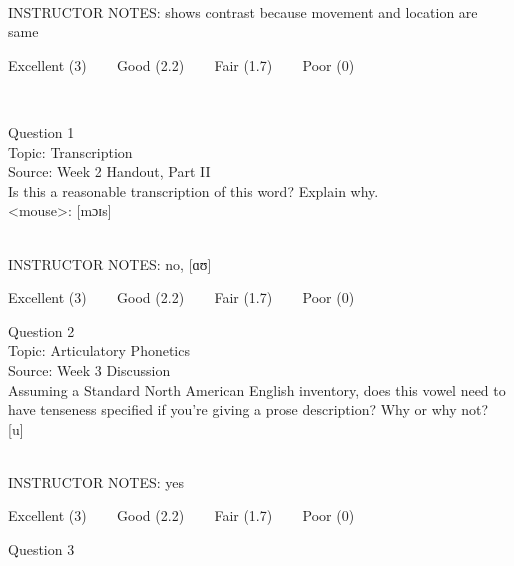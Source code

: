 \documentclass[12pt]{article}
\begin{document}
~\\
INSTRUCTOR NOTES: shows contrast because movement and location are same


\vfill
Excellent (3) ~~~ Good (2.2) ~~~ Fair (1.7) ~~~ Poor (0)
\newpage

\begin{center}
\textbf{{\color{red}{\HUGE END OF EXAM}}}\\

\end{center}
\newpage

\begin{center}
\textbf{{\color{blue}{\HUGE START OF EXAM\\}}}

\textbf{{\color{blue}{\HUGE Student ID: 68382\\}}}

\textbf{{\color{blue}{\HUGE \\}}}

\end{center}
\newpage

{\large Question 1}\\

Topic: Transcription\\
Source: Week 2 Handout, Part II\\

Is this a reasonable transcription of this word? Explain why.\\

<mouse>: {[mɔɪs]}


~\\
INSTRUCTOR NOTES: no, [ɑʊ]


\vfill
Excellent (3) ~~~ Good (2.2) ~~~ Fair (1.7) ~~~ Poor (0)
\newpage

{\large Question 2}\\

Topic: Articulatory Phonetics\\
Source: Week 3 Discussion\\

Assuming a Standard North American English inventory, does this vowel need to have tenseness specified if you're giving a prose description? Why or why not?\\

{[u]}


~\\
INSTRUCTOR NOTES: yes


\vfill
Excellent (3) ~~~ Good (2.2) ~~~ Fair (1.7) ~~~ Poor (0)
\newpage

{\large Question 3}\\
\end{document}
